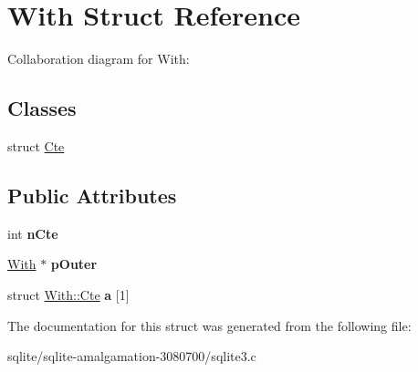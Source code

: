 \hypertarget{struct_with}{\section{With Struct Reference}
\label{struct_with}
}


Collaboration diagram for With\+:
\subsection*{Classes}
\begin{DoxyCompactItemize}
\item 
struct \hyperlink{struct_with_1_1_cte}{Cte}
\end{DoxyCompactItemize}
\subsection*{Public Attributes}
\begin{DoxyCompactItemize}
\item 
\hypertarget{struct_with_a42f5ecda008d1671bb317b8219f5a6ed}{int {\bfseries n\+Cte}}\label{struct_with_a42f5ecda008d1671bb317b8219f5a6ed}

\item 
\hypertarget{struct_with_ab86b3af65b4e3d4c0b1ee04ffa50e1d9}{\hyperlink{struct_with}{With} $\ast$ {\bfseries p\+Outer}}\label{struct_with_ab86b3af65b4e3d4c0b1ee04ffa50e1d9}

\item 
\hypertarget{struct_with_a9c68a725bc482cbcc65132a4b7b8aaf2}{struct \hyperlink{struct_with_1_1_cte}{With\+::\+Cte} {\bfseries a} \mbox{[}1\mbox{]}}\label{struct_with_a9c68a725bc482cbcc65132a4b7b8aaf2}

\end{DoxyCompactItemize}


The documentation for this struct was generated from the following file\+:\begin{DoxyCompactItemize}
\item 
sqlite/sqlite-\/amalgamation-\/3080700/sqlite3.\+c\end{DoxyCompactItemize}
